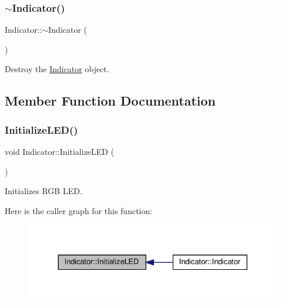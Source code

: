 \subsubsection{\texorpdfstring{$\sim$\+Indicator()}{~Indicator()}}
{\footnotesize\ttfamily Indicator\+::$\sim$\+Indicator (\begin{DoxyParamCaption}{ }\end{DoxyParamCaption})}



Destroy the \hyperlink{classIndicator}{Indicator} object. 



\subsection{Member Function Documentation}
\mbox{\label{classIndicator_ad5b03db5e614c409d69742bb6ec76ec9}} 
\subsubsection{\texorpdfstring{Initialize\+L\+E\+D()}{InitializeLED()}}
{\footnotesize\ttfamily void Indicator\+::\+Initialize\+L\+ED (\begin{DoxyParamCaption}{ }\end{DoxyParamCaption})\hspace{0.3cm}{\ttfamily [private]}}



Initializes R\+GB L\+ED. 

Here is the caller graph for this function\+:
\nopagebreak
\begin{figure}[H]
\begin{center}
\leavevmode
\includegraphics[width=330pt]{classIndicator_ad5b03db5e614c409d69742bb6ec76ec9_icgraph}
\end{center}
\end{figure}
\mbox{\label{classIndicator_a877e11943c90a02cc1a85a4d4ac3136c}} 
